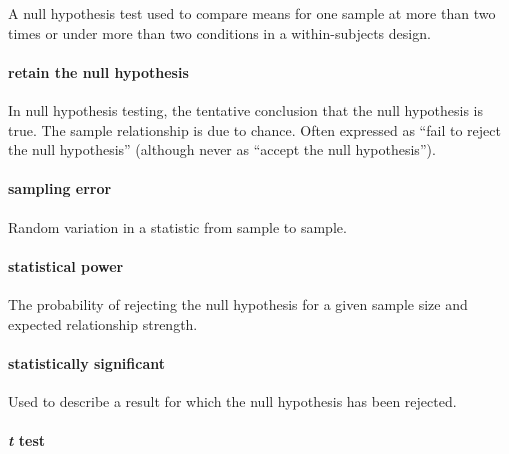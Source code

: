 \documentclass[
]{krantz}
\begin{document}
A null hypothesis test used to compare means for one sample at more than two times or under more than two conditions in a within-subjects design.

\hypertarget{retain-the-null-hypothesis}{%
\paragraph*{retain the null hypothesis}\label{retain-the-null-hypothesis}}

In null hypothesis testing, the tentative conclusion that the null hypothesis is true. The sample relationship is due to chance. Often expressed as ``fail to reject the null hypothesis'' (although never as ``accept the null hypothesis'').

\hypertarget{sampling-error}{%
\paragraph*{sampling error}\label{sampling-error}}

Random variation in a statistic from sample to sample.

\hypertarget{statistical-power-1}{%
\paragraph*{statistical power}\label{statistical-power-1}}

The probability of rejecting the null hypothesis for a given sample size and expected relationship strength.

\hypertarget{statistically-significant}{%
\paragraph*{statistically significant}\label{statistically-significant}}

Used to describe a result for which the null hypothesis has been rejected.

\hypertarget{t-test}{%
\paragraph*{\texorpdfstring{\emph{t} test}{t test}}\label{t-test}}
\end{document}
